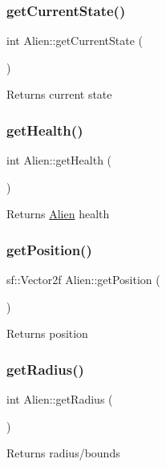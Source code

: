\subsubsection{\texorpdfstring{get\+Current\+State()}{getCurrentState()}}
{\footnotesize\ttfamily int Alien\+::get\+Current\+State (\begin{DoxyParamCaption}{ }\end{DoxyParamCaption})}

Returns current state \mbox{\label{class_alien_aa83dd26e21c40429865e3f84018545a0}} 
\subsubsection{\texorpdfstring{get\+Health()}{getHealth()}}
{\footnotesize\ttfamily int Alien\+::get\+Health (\begin{DoxyParamCaption}{ }\end{DoxyParamCaption})}

Returns \hyperlink{class_alien}{Alien} health \mbox{\label{class_alien_a52dc07105cf8ff2a25961ecebf9fbbe1}} 
\subsubsection{\texorpdfstring{get\+Position()}{getPosition()}}
{\footnotesize\ttfamily sf\+::\+Vector2f Alien\+::get\+Position (\begin{DoxyParamCaption}{ }\end{DoxyParamCaption})}

Returns position \mbox{\label{class_alien_ab649dc3a1c86463c29b32931683685ab}} 
\subsubsection{\texorpdfstring{get\+Radius()}{getRadius()}}
{\footnotesize\ttfamily int Alien\+::get\+Radius (\begin{DoxyParamCaption}{ }\end{DoxyParamCaption})}

Returns radius/bounds \mbox{\label{class_alien_a4954611d3a021f57a02564f17a3b0efc}} 
